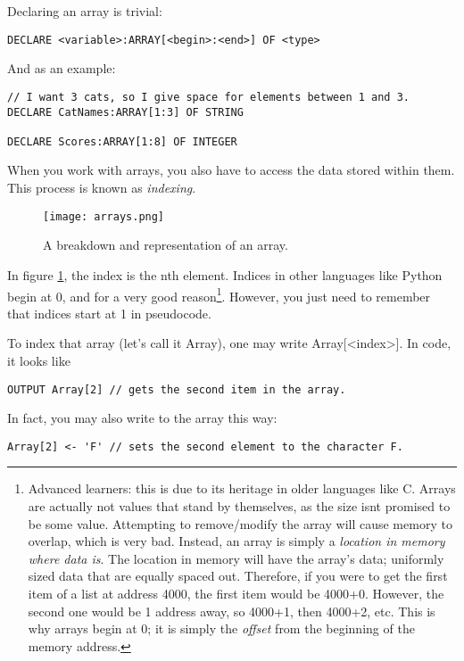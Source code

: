 \documentclass[./main.tex]{subfiles}
\begin{document}
Declaring an array is trivial:

\begin{verbatim}
DECLARE <variable>:ARRAY[<begin>:<end>] OF <type>
\end{verbatim}

And as an example:

\begin{verbatim}
// I want 3 cats, so I give space for elements between 1 and 3.
DECLARE CatNames:ARRAY[1:3] OF STRING 

DECLARE Scores:ARRAY[1:8] OF INTEGER
\end{verbatim}

When you work with arrays, you also have to access the data stored within them. This process is known as \emph{indexing}.

\begin{figure}[h]
    \centering
    \texttt{[image: arrays.png]}
    \caption{A breakdown and representation of an array.}
    \label{fig:arrays}
\end{figure}

In figure \ref{fig:arrays}, the index is the nth element. Indices in other languages like Python begin at 0, and for a very good reason\footnote{Advanced learners: this is due to its heritage in older languages like C. Arrays are actually not values that stand by themselves, as the size isnt promised to be some value. Attempting to remove/modify the array will cause memory to overlap, which is very bad. Instead, an array is simply a \emph{location in memory where data is}. The location in memory will have the array's data; uniformly sized data that are equally spaced out. Therefore, if you were to get the first item of a list at address 4000, the first item would be 4000+0. However, the second one would be 1 address away, so 4000+1, then 4000+2, etc. This is why arrays begin at 0; it is simply the \emph{offset} from the beginning of the memory address.}. However, you just need to remember that indices start at 1 in pseudocode.

To index that array (let's call it {\ccmono Array}), one may write {\ccmono Array[<index>]}. In code, it looks like

\begin{verbatim}
OUTPUT Array[2] // gets the second item in the array.
\end{verbatim}

In fact, you may also write to the array this way:

\begin{verbatim}
Array[2] <- 'F' // sets the second element to the character F.
\end{verbatim}
\end{document}
